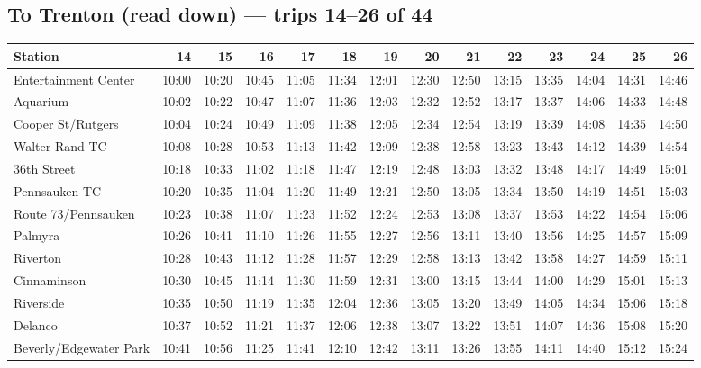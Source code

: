 \subsection*{To Trenton (read down) --- trips 14--26 of 44}
\begin{center}\footnotesize\setlength{\tabcolsep}{3pt}\begin{tabular}{@{}lrrrrrrrrrrrrr@{}}\toprule
Station & 14 & 15 & 16 & 17 & 18 & 19 & 20 & 21 & 22 & 23 & 24 & 25 & 26 \\\midrule
Entertainment Center & 10:00 & 10:20 & 10:45 & 11:05 & 11:34 & 12:01 & 12:30 & 12:50 & 13:15 & 13:35 & 14:04 & 14:31 & 14:46 \\
Aquarium & 10:02 & 10:22 & 10:47 & 11:07 & 11:36 & 12:03 & 12:32 & 12:52 & 13:17 & 13:37 & 14:06 & 14:33 & 14:48 \\
Cooper St/Rutgers & 10:04 & 10:24 & 10:49 & 11:09 & 11:38 & 12:05 & 12:34 & 12:54 & 13:19 & 13:39 & 14:08 & 14:35 & 14:50 \\
Walter Rand TC & 10:08 & 10:28 & 10:53 & 11:13 & 11:42 & 12:09 & 12:38 & 12:58 & 13:23 & 13:43 & 14:12 & 14:39 & 14:54 \\
36th Street & 10:18 & 10:33 & 11:02 & 11:18 & 11:47 & 12:19 & 12:48 & 13:03 & 13:32 & 13:48 & 14:17 & 14:49 & 15:01 \\
Pennsauken TC & 10:20 & 10:35 & 11:04 & 11:20 & 11:49 & 12:21 & 12:50 & 13:05 & 13:34 & 13:50 & 14:19 & 14:51 & 15:03 \\
Route 73/Pennsauken & 10:23 & 10:38 & 11:07 & 11:23 & 11:52 & 12:24 & 12:53 & 13:08 & 13:37 & 13:53 & 14:22 & 14:54 & 15:06 \\
Palmyra & 10:26 & 10:41 & 11:10 & 11:26 & 11:55 & 12:27 & 12:56 & 13:11 & 13:40 & 13:56 & 14:25 & 14:57 & 15:09 \\
Riverton & 10:28 & 10:43 & 11:12 & 11:28 & 11:57 & 12:29 & 12:58 & 13:13 & 13:42 & 13:58 & 14:27 & 14:59 & 15:11 \\
Cinnaminson & 10:30 & 10:45 & 11:14 & 11:30 & 11:59 & 12:31 & 13:00 & 13:15 & 13:44 & 14:00 & 14:29 & 15:01 & 15:13 \\
Riverside & 10:35 & 10:50 & 11:19 & 11:35 & 12:04 & 12:36 & 13:05 & 13:20 & 13:49 & 14:05 & 14:34 & 15:06 & 15:18 \\
Delanco & 10:37 & 10:52 & 11:21 & 11:37 & 12:06 & 12:38 & 13:07 & 13:22 & 13:51 & 14:07 & 14:36 & 15:08 & 15:20 \\
Beverly/Edgewater Park & 10:41 & 10:56 & 11:25 & 11:41 & 12:10 & 12:42 & 13:11 & 13:26 & 13:55 & 14:11 & 14:40 & 15:12 & 15:24 \\

\end{tabular}
\end{center}
